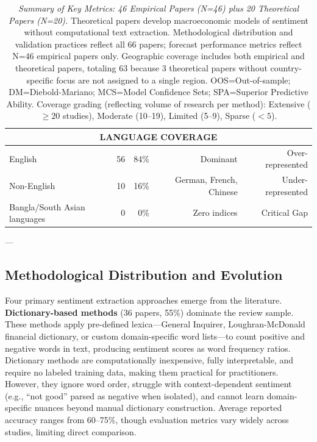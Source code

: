 \documentclass[11pt,twocolumn]{article}
\begin{document}
\begin{table}[t]
{\begin{tabular}{|l|r|r|r|r|}
\hline
\multicolumn{5}{|c|}{\textbf{LANGUAGE COVERAGE}} \\
\hline
English & 56 & 84\% & Dominant & Over-represented \\
Non-English & 10 & 16\% & German, French, Chinese & Under-represented \\
Bangla/South Asian languages & 0 & 0\% & Zero indices & Critical Gap \\
\hline
\end{tabular}
}%
\caption{\textit{Summary of Key Metrics: 46 Empirical Papers (N=46) plus 20 Theoretical Papers (N=20).} Theoretical papers develop macroeconomic models of sentiment without computational text extraction. Methodological distribution and validation practices reflect all 66 papers; forecast performance metrics reflect N=46 empirical papers only. Geographic coverage includes both empirical and theoretical papers, totaling 63 because 3 theoretical papers without country-specific focus are not assigned to a single region. OOS=Out-of-sample; DM=Diebold-Mariano; MCS=Model Confidence Sets; SPA=Superior Predictive Ability. Coverage grading (reflecting volume of research per method): Extensive ($\geq 20$ studies), Moderate (10--19), Limited (5--9), Sparse ($<5$).}
\label{tab:metasummary}
\end{table}

---

\subsection{Methodological Distribution and Evolution}

Four primary sentiment extraction approaches emerge from the literature. \textbf{Dictionary-based methods} (36 papers, 55\%) dominate the review sample. These methods apply pre-defined lexica---General Inquirer, Loughran-McDonald financial dictionary, or custom domain-specific word lists---to count positive and negative words in text, producing sentiment scores as word frequency ratios. Dictionary methods are computationally inexpensive, fully interpretable, and require no labeled training data, making them practical for practitioners. However, they ignore word order, struggle with context-dependent sentiment (e.g., ``not good'' parsed as negative when isolated), and cannot learn domain-specific nuances beyond manual dictionary construction. Average reported accuracy ranges from 60--75\%, though evaluation metrics vary widely across studies, limiting direct comparison.
\end{document}

